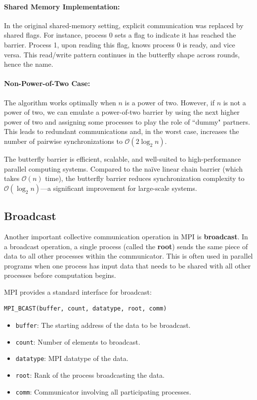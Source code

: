 \documentclass[12pt]{book}
\begin{document}
\paragraph{Shared Memory Implementation:}  
In the original shared-memory setting, explicit communication was replaced by shared flags. For instance, process 0 sets a flag to indicate it has reached the barrier. Process 1, upon reading this flag, knows process 0 is ready, and vice versa. This read/write pattern continues in the butterfly shape across rounds, hence the name.

\paragraph{Non-Power-of-Two Case:}  
The algorithm works optimally when $n$ is a power of two. However, if $n$ is not a power of two, we can emulate a power-of-two barrier by using the next higher power of two and assigning some processes to play the role of ``dummy" partners. This leads to redundant communications and, in the worst case, increases the number of pairwise synchronizations to $\mathcal{O}(2\log_2 n)$.

The butterfly barrier is efficient, scalable, and well-suited to high-performance parallel computing systems. Compared to the naïve linear chain barrier (which takes $\mathcal{O}(n)$ time), the butterfly barrier reduces synchronization complexity to $\mathcal{O}(\log_2 n)$—a significant improvement for large-scale systems.

\subsection{Broadcast}

Another important collective communication operation in MPI is \textbf{broadcast}. In a broadcast operation, a single process (called the \textbf{root}) sends the same piece of data to all other processes within the communicator. This is often used in parallel programs when one process has input data that needs to be shared with all other processes before computation begins.

MPI provides a standard interface for broadcast:

\begin{lstlisting}
MPI_BCAST(buffer, count, datatype, root, comm)    
\end{lstlisting}

\begin{itemize}
    \item \texttt{buffer}: The starting address of the data to be broadcast.
    \item \texttt{count}: Number of elements to broadcast.
    \item \texttt{datatype}: MPI datatype of the data.
    \item \texttt{root}: Rank of the process broadcasting the data.
    \item \texttt{comm}: Communicator involving all participating processes.
\end{itemize}
\end{document}
